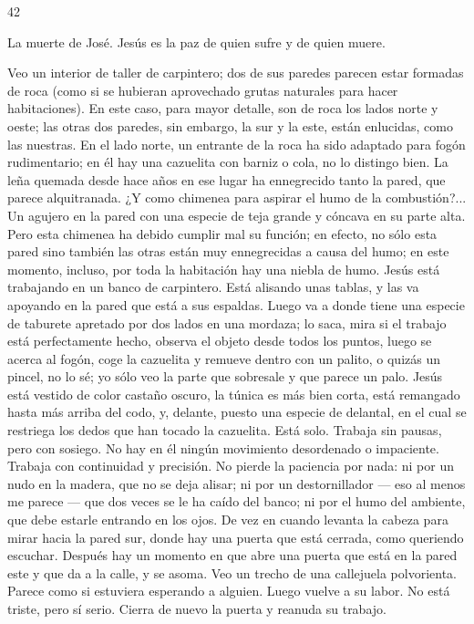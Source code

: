 \documentclass[12pt]{book} %
\begin{document}
 
42 
 
La muerte de José. Jesús es la paz de quien sufre y de quien muere. 
 
Veo un interior de taller de carpintero; dos de sus paredes parecen estar formadas de roca (como si se hubieran 
aprovechado grutas naturales para hacer habitaciones). En este caso, para mayor detalle, son de roca los lados norte y oeste; las otras dos paredes, sin embargo, la sur y la este, están enlucidas, como las nuestras. 
En el lado norte, un entrante de la roca ha sido adaptado para fogón rudimentario; en él hay una cazuelita con barniz o 
cola, no lo distingo bien. La leña quemada desde hace años en ese lugar ha ennegrecido tanto la pared, que parece alquitranada. ¿Y como chimenea para aspirar el humo de la combustión?... Un agujero en la pared con una especie de teja grande y cóncava en su parte alta. Pero esta chimenea ha debido cumplir mal su función; en efecto, no sólo esta pared sino también las otras están muy ennegrecidas a causa del humo; en este momento, incluso, por toda la habitación hay una niebla de humo. Jesús está trabajando en un banco de carpintero. Está alisando unas tablas, y las va apoyando en la pared que está a sus espaldas. Luego va a donde tiene una especie de taburete apretado por dos lados en una mordaza; lo saca, mira si el trabajo está perfectamente hecho, observa el objeto desde todos los puntos, luego se acerca al fogón, coge la cazuelita y remueve dentro con un palito, o quizás un pincel, no lo sé; yo sólo veo la parte que sobresale y que parece un palo. 
Jesús está vestido de color castaño oscuro, la túnica es más bien corta, está remangado hasta más arriba del codo, y, 
delante, puesto una especie de delantal, en el cual se restriega los dedos que han tocado la cazuelita. 
Está solo. Trabaja sin pausas, pero con sosiego. No hay en él ningún movimiento desordenado o impaciente. Trabaja con continuidad y precisión. No pierde la paciencia por nada: ni por un nudo en la madera, que no se deja alisar; ni por un destornillador — eso al menos me parece — que dos veces se le ha caído del banco; ni por el humo del ambiente, que debe estarle entrando en los ojos. 
De vez en cuando levanta la cabeza para mirar hacia la pared sur, donde hay una puerta que está cerrada, como queriendo escuchar. Después hay un momento en que abre una puerta que está en la pared este y que da a la calle, y se asoma. Veo un trecho de una callejuela polvorienta. Parece como si estuviera esperando a alguien. Luego vuelve a su labor. No está triste, pero sí serio. Cierra de nuevo la puerta y reanuda su trabajo. 
\end{document}
